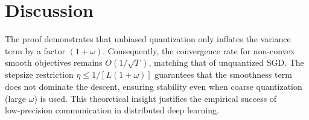 \documentclass{article}
\begin{document}
\section*{Discussion}
The proof demonstrates that unbiased quantization only inflates the variance term by a factor $(1+\omega)$. Consequently, the convergence rate for non‑convex smooth objectives remains $O(1/\sqrt{T})$, matching that of unquantized SGD. The stepsize restriction $\eta\le 1/[L(1+\omega)]$ guarantees that the smoothness term does not dominate the descent, ensuring stability even when coarse quantization (large $\omega$) is used. This theoretical insight justifies the empirical success of low‑precision communication in distributed deep learning.
\end{document}
